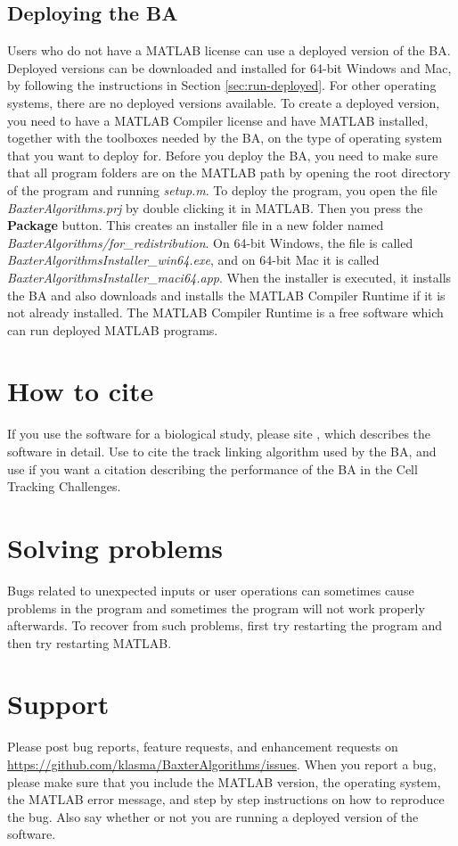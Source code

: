 \documentclass[a4paper, oneside, onecolumn, 11pt]{article}
\newcommand{\file}[1]{\emph{#1}}
\newcommand{\control}[1]{\textbf{#1}}
\begin{document}
\subsection{Deploying the BA}
\label{sec:deploy}
Users who do not have a MATLAB license can use a deployed version of the BA. Deployed versions can be downloaded and installed for 64-bit Windows and Mac, by following the instructions in Section \ref{sec:run-deployed}. For other operating systems, there are no deployed versions available. To create a deployed version, you need to have a MATLAB Compiler license and have MATLAB installed, together with the toolboxes needed by the BA, on the type of operating system that you want to deploy for. Before you deploy the BA, you need to make sure that all program folders are on the MATLAB path by opening the root directory of the program and running \file{setup.m}. To deploy the program, you open the file \file{BaxterAlgorithms.prj} by double clicking it in MATLAB. Then you press the \control{Package} button. This creates an installer file in a new folder named \file{BaxterAlgorithms/for\_redistribution}. On 64-bit Windows, the file is called \file{BaxterAlgorithmsInstaller\_win64.exe}, and on 64-bit Mac it is called \file{BaxterAlgorithmsInstaller\_maci64.app}. When the installer is executed, it installs the BA and also downloads and installs the MATLAB Compiler Runtime if it is not already installed. The MATLAB Compiler Runtime is a free software which can run deployed MATLAB programs.

\section{How to cite}
If you use the software for a biological study, please site \cite{Magnusson16Thesis}, which describes the software in detail. Use \cite{Magnusson15Viterbi} to cite the track linking algorithm used by the BA, and use \cite{Ulman17Objective} if you want a citation describing the performance of the BA in the Cell Tracking Challenges.

\section{Solving problems}
Bugs related to unexpected inputs or user operations can sometimes cause problems in the program and sometimes the program will not work properly afterwards. To recover from such problems, first try restarting the program and then try restarting MATLAB.

\section{Support}
Please post bug reports, feature requests, and enhancement requests on \url{https://github.com/klasma/BaxterAlgorithms/issues}. When you report a bug, please make sure that you include the MATLAB version, the operating system, the MATLAB error message, and step by step instructions on how to reproduce the bug. Also say whether or not you are running a deployed version of the software.
\end{document}
